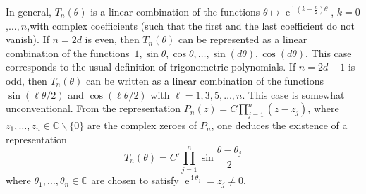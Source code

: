 \documentclass[AHL,Unicode,longabstracts,published]{cedram}
\DeclareMathOperator{\eee}{e}
\DeclareMathOperator{\ii}{i}
\newcommand{\C}{\mathbb{C}}
\begin{document}
In general, $T_n(\theta)$ is a linear combination of the functions $\theta \mapsto \eee^{\ii (k-\frac n2) \theta}$, $k=0$,$\ldots, n$,\linebreak with complex coefficients (such that the first and the last coefficient do not vanish). If $n=2d$ is even, then $T_n(\theta)$ can be represented as a linear combination of the functions~$1, \sin \theta, \cos \theta,\ldots, \sin (d\theta), \cos (d\theta)$. This case corresponds to the usual definition of trigonometric polynomials. If $n=2d+1$ is odd, then $T_n(\theta)$ can be written as a linear combination of the functions $\sin (\ell \theta/2)$ and $\cos (\ell \theta/2)$ with $\ell = 1,3,5,\ldots, n$. This case is somewhat unconventional. From the representation $P_n(z) = C \prod_{j=1}^n (z-z_j)$, where $z_1,\ldots, z_n\in \C\backslash\{0\}$ are the complex zeroes of $P_n$, one deduces the existence of a representation
\[
T_n(\theta) = C' \prod_{j=1}^n \sin \frac {\theta - \theta_j} 2
\]
where $\theta_1,\ldots,\theta_n\in \C$ are chosen to satisfy $\eee^{\ii \theta_j} = z_j\neq 0$.
\end{document}
